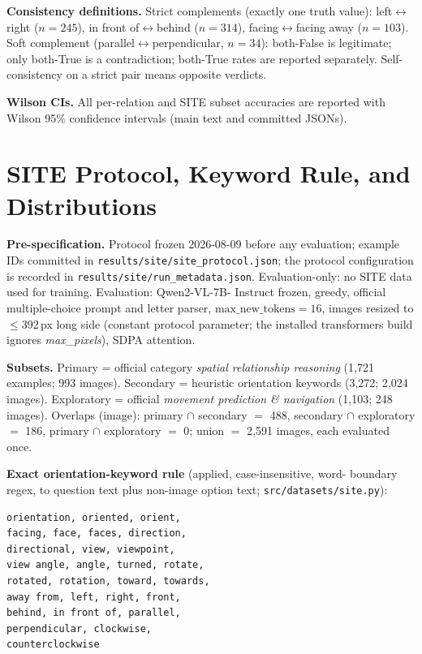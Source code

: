 \textbf{Consistency definitions.} Strict complements (exactly one truth value):
left$\leftrightarrow$right ($n{=}245$), in front of$\leftrightarrow$behind
($n{=}314$), facing$\leftrightarrow$facing away ($n{=}103$). Soft complement
(parallel$\leftrightarrow$perpendicular, $n{=}34$): both-False is legitimate;
only both-True is a contradiction; both-True rates are reported separately.
Self-consistency on a strict pair means opposite verdicts.

\textbf{Wilson CIs.} All per-relation and SITE subset accuracies are reported
with Wilson 95\% confidence intervals (main text and committed JSONs).

\section{SITE Protocol, Keyword Rule, and Distributions}
\label{app:site}

\textbf{Pre-specification.} Protocol frozen 2026-08-09 before any evaluation;
example IDs committed in \texttt{results/site/site\_protocol.json}; the
protocol configuration is recorded in \texttt{results/site/run\_metadata.json}.
Evaluation-only: no SITE data used for training. Evaluation: Qwen2-VL-7B-
Instruct frozen, greedy, official multiple-choice prompt and letter parser,
$\mathrm{max\_new\_tokens}{=}16$, images resized to $\le$392\,px long side
(constant protocol parameter; the installed transformers build ignores
\emph{max\_pixels}), SDPA attention.

\textbf{Subsets.} Primary = official category \emph{spatial relationship
reasoning} (1{,}721 examples; 993 images). Secondary = heuristic orientation
keywords (3{,}272; 2{,}024 images). Exploratory = official \emph{movement
prediction \& navigation} (1{,}103; 248 images). Overlaps (image): primary
$\cap$ secondary $=$ 488, secondary $\cap$ exploratory $=$ 186, primary $\cap$
exploratory $=$ 0; union $=$ 2{,}591 images, each evaluated once.

\textbf{Exact orientation-keyword rule} (applied, case-insensitive, word-
boundary regex, to question text plus non-image option text;
\texttt{src/datasets/site.py}):
\begin{verbatim}
orientation, oriented, orient,
facing, face, faces, direction,
directional, view, viewpoint,
view angle, angle, turned, rotate,
rotated, rotation, toward, towards,
away from, left, right, front,
behind, in front of, parallel,
perpendicular, clockwise,
counterclockwise
\end{verbatim}

